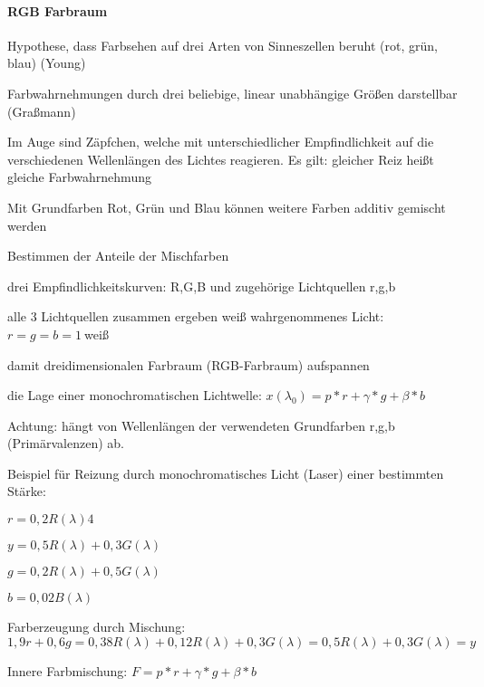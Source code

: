 \documentclass[landscape]{article}
\begin{document}
\begin{multicols}{3}
  \paragraph{RGB Farbraum}
  \begin{itemize*}
    \item Hypothese, dass Farbsehen auf drei Arten von Sinneszellen beruht (rot, grün, blau) (Young)
    \item Farbwahrnehmungen durch drei beliebige, linear unabhängige Größen darstellbar (Graßmann)
    \item Im Auge sind Zäpfchen, welche mit unterschiedlicher Empfindlichkeit auf die verschiedenen Wellenlängen des Lichtes reagieren. Es gilt: gleicher Reiz heißt gleiche Farbwahrnehmung
    \item Mit Grundfarben Rot, Grün und Blau können weitere Farben additiv gemischt werden
    \item Bestimmen der Anteile der Mischfarben
          \begin{itemize*}
            \item drei Empfindlichkeitskurven: R,G,B und zugehörige Lichtquellen r,g,b
            \item alle 3 Lichtquellen zusammen ergeben weiß wahrgenommenes Licht: $r=g=b=1~$weiß
            \item damit dreidimensionalen Farbraum (RGB-Farbraum) aufspannen
            \item die Lage einer monochromatischen Lichtwelle: $x(\lambda_0)=p*r+\gamma*g+\beta*b$
            \item Achtung: hängt von Wellenlängen der verwendeten Grundfarben r,g,b (Primärvalenzen) ab.
          \end{itemize*}
  \end{itemize*}
  
  Beispiel für Reizung durch monochromatisches Licht (Laser) einer bestimmten Stärke:
  \begin{itemize*}
    \item $r=0,2R(\lambda)4$
    \item $y=0,5R(\lambda)+0,3G(\lambda)$
    \item $g=0,2R(\lambda)+0,5G(\lambda)$
    \item $b=0,02B(\lambda)$
  \end{itemize*}
  
  Farberzeugung durch Mischung:
  $$1,9r + 0,6g = 0,38R(\lambda)+0,12R(\lambda)+0,3G(\lambda)=0,5R(\lambda)+0,3G(\lambda) = y$$
  
  
  Innere Farbmischung: $F=p*r + \gamma*g + \beta*b$
  

\end{multicols}
\end{document}
